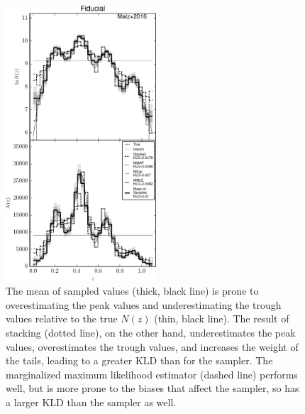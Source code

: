 \documentclass[preprint]{aastex}
\begin{document}
\begin{figure}
\includegraphics[width=0.5\textwidth]{figs/sig2/comps.pdf}
\caption{The mean of sampled values (thick, black line) is prone to 
overestimating the peak values and underestimating the trough values relative 
to the true $N(z)$ (thin, black line).  The result of stacking (dotted line), 
on the other hand, underestimates the peak values, overestimates the trough 
values, and increases the weight of the tails, leading to a greater KLD than 
for the sampler.  The marginalized maximum likelihood estimator (dashed line) 
performs well, but is more prone to the biases that affect the sampler, so has 
a larger KLD than the sampler as well.}
\label{fig:sig2-comp}
\end{figure}
\end{document}
